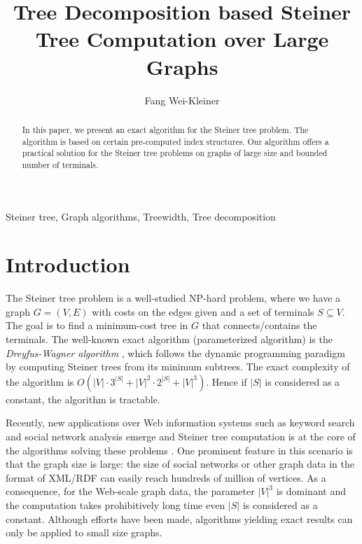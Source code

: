 \documentclass[preprint,12pt]{elsarticle}
\begin{document}
\begin{frontmatter}

\title{Tree Decomposition based Steiner Tree Computation over Large Graphs}


\author[label1]{Fang Wei-Kleiner}
 \address[label1]{Lin\"oping University, Sweden}









\begin{abstract}
In this paper, we present an exact algorithm  for the Steiner tree problem.
The algorithm
is based on certain pre-computed index structures.
Our algorithm offers a practical solution
for the Steiner tree problems on graphs of large size and bounded number of terminals.
\end{abstract}

\begin{keyword}
Steiner tree, Graph algorithms, Treewidth, Tree decomposition
\end{keyword}

\end{frontmatter}

\section{Introduction}




The Steiner tree  problem is a well-studied NP-hard problem,
where we have a  graph $G = (V,E)$ with costs on the edges given
and a set of terminals $S \subseteq V$. The goal is to find a minimum-cost tree in $G$ that connects/contains the terminals. 
The well-known exact algorithm (parameterized algorithm)  is the 
\emph{Dreyfus-Wagner algorithm} \cite{DW}, which follows the dynamic programming paradigm by computing 
Steiner trees  from its minimum subtrees.
The exact complexity of the algorithm
is $O(|V| \cdot 3^{|S|} +|V|^2 \cdot 2^{|S|} + |V|^3)$.
Hence if $|S|$ is considered as a constant, the algorithm is tractable.

Recently, new applications over Web information systems such as keyword search and social network analysis 
emerge and Steiner tree computation is at the core of the algorithms solving these problems \cite{Li2001WWW}.
One prominent feature in this scenario is that the graph size is large: the size of social networks
or other graph data in the format of XML/RDF  can easily reach hundreds of million of vertices.
As a consequence, for the Web-scale graph data, the parameter $|V|^3$ is dominant and
the computation takes prohibitively long time even $|S|$ is considered as a constant.
Although efforts have been made, algorithms yielding exact results
can only be applied to small size graphs\cite{DPBF}.
\end{document}
